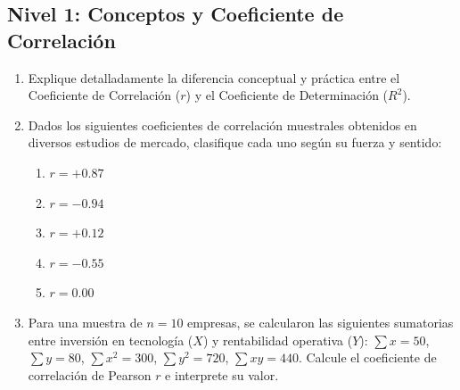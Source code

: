 \subsection*{Nivel 1: Conceptos y Coeficiente de Correlación}
\begin{enumerate}
    \item Explique detalladamente la diferencia conceptual y práctica entre el Coeficiente de Correlación ($r$) y el Coeficiente de Determinación ($R^2$).
    \item Dados los siguientes coeficientes de correlación muestrales obtenidos en diversos estudios de mercado, clasifique cada uno según su fuerza y sentido:
    \begin{enumerate}
        \item $r = +0.87$
        \item $r = -0.94$
        \item $r = +0.12$
        \item $r = -0.55$
        \item $r = 0.00$
    \end{enumerate}
    \item Para una muestra de $n = 10$ empresas, se calcularon las siguientes sumatorias entre inversión en tecnología ($X$) y rentabilidad operativa ($Y$):
    $\sum x = 50$, $\sum y = 80$, $\sum x^2 = 300$, $\sum y^2 = 720$, $\sum xy = 440$.
    Calcule el coeficiente de correlación de Pearson $r$ e interprete su valor.
\end{enumerate}


